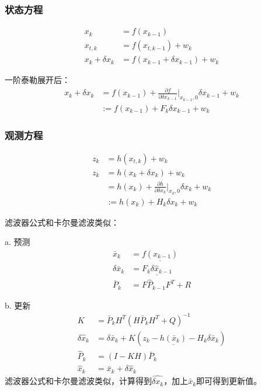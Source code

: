 \subsubsection*{状态方程}
\begin{equation}
	\begin{split}
		x_{k} &= f(x_{k-1}) \\
		x_{t,k} &= f(x_{t,{k-1}}) + w_k \\
		x_k+\delta{x_k} &= f(x_{k-1}+\delta{x_{k-1}})+w_k
	\end{split}
\end{equation}
\par 一阶泰勒展开后：
\begin{equation}
	\begin{split}
		x_k+\delta{x_k} &= f(x_{k-1})+\frac{\partial f}{\partial\delta{x_{k-1}}}\bigg|_{x_{k-1},0} \delta{x_{k-1}} + w_k \\
		&:= f(x_{k-1})+F_k \delta{x_{k-1}} + w_k
	\end{split}
\end{equation}
\subsubsection*{观测方程}
\begin{equation}
	\begin{split}
		z_k &= h(x_{t,k}) + w_k \\
		z_k &= h(x_k+\delta{x_k})+w_k \\
		&= h(x_k)+\frac{\partial h}{\partial\delta{x_k}}\bigg|_{x_k,0} \delta{x_k} + w_k \\
		&:= h(x_k)+H_k \delta{x_k} + w_k
	\end{split}
\end{equation}
\par 滤波器公式和卡尔曼滤波类似：
\par a. 预测
\begin{equation}
	\begin{split}
		\bar{x}_k &= \underline{ f(\hat{x}_{k-1}) } \\
		\delta\bar{x}_k &= \underline{ F_k \delta\hat{x}_{k-1} } \\
		\bar{P}_k&=F\hat{P}_{k-1}F^T+R
	\end{split}
\end{equation}
\par b. 更新
\begin{equation}
	\begin{split}
		K&=\bar{P}_k H^T(H \bar{P}_k H^T + Q)^{-1} \\
		\delta\hat{x}_k&=\delta\bar{x}_k+K(z_k - \underline{h(\bar{x}_k)} - H_k\delta\bar{x}_k) \\
		\hat{P}_k&=(I-K H)\bar{P}_k \\
		\hat{x}_k &= \bar{x}_k + \delta\hat{x}_k
	\end{split}
\end{equation}
滤波器公式和卡尔曼滤波类似，计算得到$\hat{\delta{x_k}}$，加上$\bar{x}_k$即可得到更新值。



